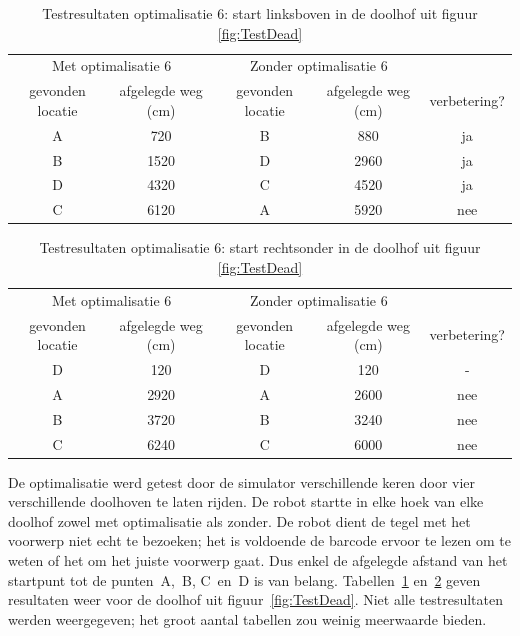 \documentclass[tt3]{penoverslag}
\begin{document}
\begin{table}[h]
\begin{center}
    \begin{tabular}{ c | c | c | c | c}
   \multicolumn{2}{c|}{Met optimalisatie 6} & \multicolumn{2}{|c|}{Zonder optimalisatie 6} & \\
     gevonden locatie & afgelegde weg (cm) & gevonden locatie &  afgelegde weg (cm) & verbetering?\\ \hline\hline
    A & 720 & B & 880 & ja \\ \hline
    B & 1520 & D & 2960 & ja \\ \hline
    D & 4320 & C & 4520 & ja\\ \hline
    C & 6120 & A & 5920 & nee\\
    \end{tabular}
    \caption{Testresultaten optimalisatie 6: start linksboven in de doolhof uit figuur \ref{fig:TestDead}}
    \label{tab:resultVerken1}
\end{center}
\end{table}

\begin{table}[h]
\begin{center}
    \begin{tabular}{c | c | c | c | c}
   \multicolumn{2}{c|}{Met optimalisatie 6} & \multicolumn{2}{|c|}{Zonder optimalisatie 6} &\\
     gevonden locatie &  afgelegde weg (cm) & gevonden locatie &  afgelegde weg (cm)& verbetering?\\ \hline\hline
    D & 120 & D & 120 & -\\ \hline
    A & 2920 & A & 2600 & nee\\ \hline
    B & 3720 & B & 3240 & nee\\ \hline
    C & 6240 & C & 6000 & nee\\
    \end{tabular}
    \caption{Testresultaten optimalisatie 6: start rechtsonder in de doolhof uit figuur \ref{fig:TestDead}}
    \label{tab:resultVerken2}
\end{center}
\end{table}

De optimalisatie werd getest door de simulator verschillende keren door vier verschillende doolhoven te laten rijden. De robot startte in elke hoek van elke doolhof zowel met optimalisatie als zonder. De robot dient de tegel met het voorwerp niet echt te bezoeken; het is voldoende de barcode ervoor te lezen om te weten of het om het juiste voorwerp gaat. Dus enkel de afgelegde afstand van het startpunt tot de punten~A,~B, C~en~D is van belang. Tabellen~\ref{tab:resultVerken1} en~\ref{tab:resultVerken2} geven resultaten weer voor de doolhof uit figuur~\ref{fig:TestDead}. Niet alle testresultaten werden weergegeven; het groot aantal tabellen zou weinig meerwaarde bieden.\\
\end{document}
